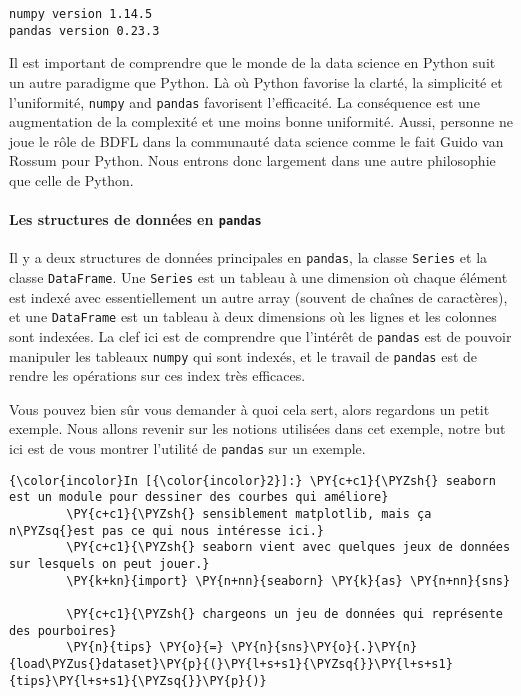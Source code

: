     \begin{Verbatim}[commandchars=\\\{\}]
numpy version 1.14.5
pandas version 0.23.3

    \end{Verbatim}

    Il est important de comprendre que le monde de la data science en Python
suit un autre paradigme que Python. Là où Python favorise la clarté, la
simplicité et l'uniformité, \texttt{numpy} and \texttt{pandas}
favorisent l'efficacité. La conséquence est une augmentation de la
complexité et une moins bonne uniformité. Aussi, personne ne joue le
rôle de BDFL dans la communauté data science comme le fait Guido van
Rossum pour Python. Nous entrons donc largement dans une autre
philosophie que celle de Python.

    \hypertarget{les-structures-de-donnuxe9es-en-pandas}{%
\paragraph{\texorpdfstring{Les structures de données en
\texttt{pandas}}{Les structures de données en pandas}}\label{les-structures-de-donnuxe9es-en-pandas}}

    Il y a deux structures de données principales en \texttt{pandas}, la
classe \texttt{Series} et la classe \texttt{DataFrame}. Une
\texttt{Series} est un tableau à une dimension où chaque élément est
indexé avec essentiellement un autre array (souvent de chaînes de
caractères), et une \texttt{DataFrame} est un tableau à deux dimensions
où les lignes et les colonnes sont indexées. La clef ici est de
comprendre que l'intérêt de \texttt{pandas} est de pouvoir manipuler les
tableaux \texttt{numpy} qui sont indexés, et le travail de
\texttt{pandas} est de rendre les opérations sur ces index très
efficaces.

    Vous pouvez bien sûr vous demander à quoi cela sert, alors regardons un
petit exemple. Nous allons revenir sur les notions utilisées dans cet
exemple, notre but ici est de vous montrer l'utilité de \texttt{pandas}
sur un exemple.

    \begin{Verbatim}[commandchars=\\\{\}]
{\color{incolor}In [{\color{incolor}2}]:} \PY{c+c1}{\PYZsh{} seaborn est un module pour dessiner des courbes qui améliore}
        \PY{c+c1}{\PYZsh{} sensiblement matplotlib, mais ça n\PYZsq{}est pas ce qui nous intéresse ici.}
        \PY{c+c1}{\PYZsh{} seaborn vient avec quelques jeux de données sur lesquels on peut jouer.}
        \PY{k+kn}{import} \PY{n+nn}{seaborn} \PY{k}{as} \PY{n+nn}{sns}
        
        \PY{c+c1}{\PYZsh{} chargeons un jeu de données qui représente des pourboires}
        \PY{n}{tips} \PY{o}{=} \PY{n}{sns}\PY{o}{.}\PY{n}{load\PYZus{}dataset}\PY{p}{(}\PY{l+s+s1}{\PYZsq{}}\PY{l+s+s1}{tips}\PY{l+s+s1}{\PYZsq{}}\PY{p}{)}
\end{Verbatim}


